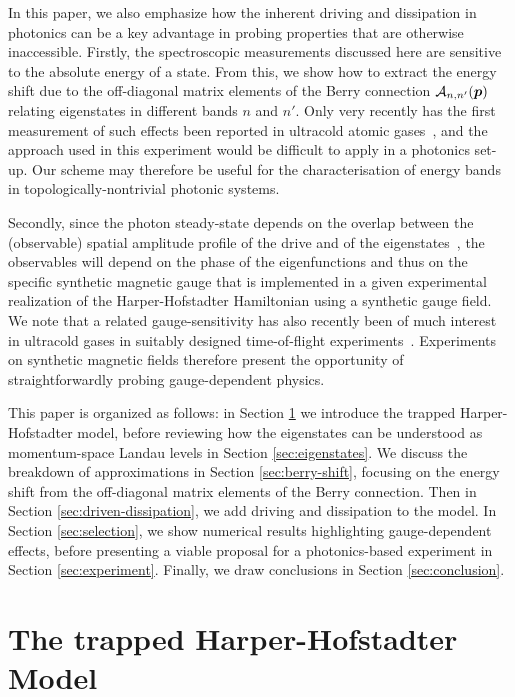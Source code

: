 In this paper, we also emphasize how the inherent driving and dissipation in photonics can be a key advantage in probing properties that are otherwise inaccessible. 
Firstly, the spectroscopic measurements discussed here are sensitive to the absolute energy of a state. From this, we show how to extract the energy shift due to the off-diagonal matrix elements of the Berry connection $\mathcal{A}_{n,n'}(\bm{p})$ relating eigenstates in different bands $n$ and $n'$. Only very recently has the first measurement of such effects been reported in ultracold atomic gases~\cite{Grusdt2014nonabelian,tracy2015arxiv}, and the approach used in this experiment would be difficult to apply in a photonics set-up. Our scheme may therefore be useful for the characterisation of energy bands in topologically-nontrivial photonic systems.

Secondly, since the photon steady-state depends on the overlap between the (observable) spatial amplitude profile of the drive and of the eigenstates~\cite{carusotto2013fluids}, the observables will depend on the phase of the eigenfunctions and thus on the specific synthetic magnetic gauge that is implemented in a given experimental realization of the Harper-Hofstadter Hamiltonian using a synthetic gauge field. We note that a related gauge-sensitivity has also recently been of much interest in ultracold gases in suitably designed time-of-flight experiments~\cite{kennedy2015bec,spielman2011gauge, spielman_gauge, tomoki2015nv}. Experiments on synthetic magnetic fields therefore present the opportunity of straightforwardly probing gauge-dependent physics. 

This paper is organized as follows: in Section \ref{sec:model} we introduce the trapped Harper-Hofstadter model, before reviewing how the eigenstates can be understood as momentum-space Landau levels in Section \ref{sec:eigenstates}. We discuss the breakdown of approximations in Section \ref{sec:berry-shift}, focusing on the energy shift from the off-diagonal matrix elements of the Berry connection. Then in Section \ref{sec:driven-dissipation}, we add driving and dissipation to the model. In Section \ref{sec:selection}, we show numerical results highlighting gauge-dependent effects, before presenting a viable proposal for a
photonics-based experiment in Section \ref{sec:experiment}. Finally, we draw conclusions in Section \ref{sec:conclusion}. 


\section{The trapped Harper-Hofstadter Model}
\label{sec:model}

